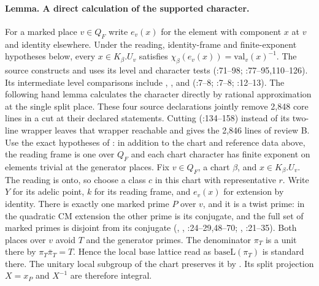 \paragraph{Lemma. A direct calculation of the supported character.}\label{r13:near-character}
For a marked place $v\in Q_F$ write $e_v(x)$ for the element with
component $x$ at $v$ and identity elsewhere. Under the reading,
identity-frame and finite-exponent hypotheses below, every
$x\in K_\beta.U_v$ satisfies
$\chi_\beta(e_v(x))=\mathrm{val}_v(x)^{-1}$.
The source constructs  and uses its level and character
tests (:71--98;
:77--95,110--126).
Its intermediate level comparisons include
,
, and
(:7--8;
:7--8;
:12--13).
The following hand lemma calculates the character directly by rational
approximation at the single split place. These four source declarations
jointly remove 2,848 core lines in a cut at their declared statements.
Cutting 
(:134--158)
instead of its two-line wrapper leaves that wrapper reachable and
gives the 2,846 lines of review B.
Use the exact hypotheses of
:
in addition to the chart and reference data above, the reading frame is one
over $Q_F$ and each chart character has finite exponent on elements
trivial at the generator places. Fix $v\in Q_F$, a chart $\beta$, and
$x\in K_\beta.U_v$. The reading is onto, so choose a class $c$ in this
chart with representative $r$. Write $Y$ for its adelic point, $k$ for
its reading frame, and $e_v(x)$ for extension by identity.
There is exactly one marked prime $P$ over $v$, and it is a twist
prime: in the quadratic CM extension the other prime is its conjugate,
and the full set of marked primes is disjoint from its conjugate
(, , :24--29,48--70;
, :21--35).
Both places over $v$ avoid $T$ and the generator primes. The denominator
$\pi_T$ is a unit there by $\pi_T\bar\pi_T=T$. Hence the local base
lattice read as $\mathrm{baseL}(\pi_T)$ is standard there.
The unitary local subgroup of the chart preserves it by
. Its split projection $X=x_P$ and $X^{-1}$
are therefore integral.

